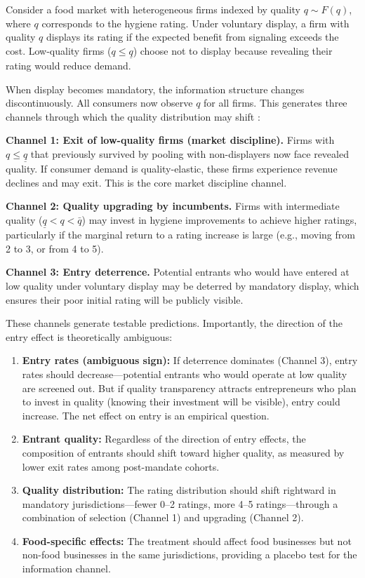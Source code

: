 \documentclass[12pt]{article}
\begin{document}
Consider a food market with heterogeneous firms indexed by quality $q \sim F(q)$, where $q$ corresponds to the hygiene rating. Under voluntary display, a firm with quality $q$ displays its rating if the expected benefit from signaling exceeds the cost. Low-quality firms ($q \leq \underline{q}$) choose not to display because revealing their rating would reduce demand.

When display becomes mandatory, the information structure changes discontinuously. All consumers now observe $q$ for all firms. This generates three channels through which the quality distribution may shift \citep[cf.][]{jovanovic1982selection, dunne1988patterns}:

\textbf{Channel 1: Exit of low-quality firms (market discipline).} Firms with $q \leq \underline{q}$ that previously survived by pooling with non-displayers now face revealed quality. If consumer demand is quality-elastic, these firms experience revenue declines and may exit. This is the core market discipline channel.

\textbf{Channel 2: Quality upgrading by incumbents.} Firms with intermediate quality ($\underline{q} < q < \bar{q}$) may invest in hygiene improvements to achieve higher ratings, particularly if the marginal return to a rating increase is large (e.g., moving from 2 to 3, or from 4 to 5).

\textbf{Channel 3: Entry deterrence.} Potential entrants who would have entered at low quality under voluntary display may be deterred by mandatory display, which ensures their poor initial rating will be publicly visible.

These channels generate testable predictions. Importantly, the direction of the entry effect is theoretically ambiguous:

\begin{enumerate}
    \item \textbf{Entry rates (ambiguous sign):} If deterrence dominates (Channel 3), entry rates should decrease---potential entrants who would operate at low quality are screened out. But if quality transparency attracts entrepreneurs who plan to invest in quality (knowing their investment will be visible), entry could increase. The net effect on entry is an empirical question.
    \item \textbf{Entrant quality:} Regardless of the direction of entry effects, the composition of entrants should shift toward higher quality, as measured by lower exit rates among post-mandate cohorts.
    \item \textbf{Quality distribution:} The rating distribution should shift rightward in mandatory jurisdictions---fewer 0--2 ratings, more 4--5 ratings---through a combination of selection (Channel 1) and upgrading (Channel 2).
    \item \textbf{Food-specific effects:} The treatment should affect food businesses but not non-food businesses in the same jurisdictions, providing a placebo test for the information channel.
\end{enumerate}
\end{document}
